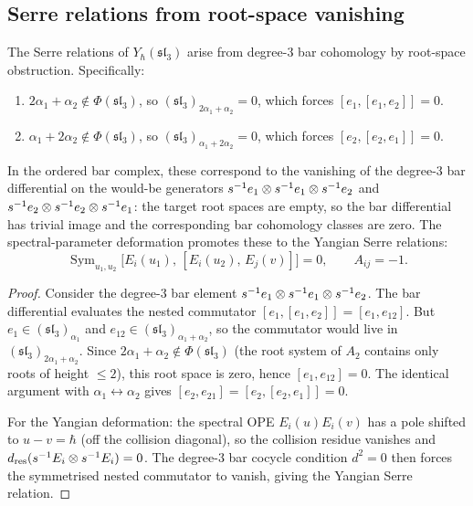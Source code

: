 \subsection{Serre relations from root-space vanishing}

\begin{proposition}
\label{prop:sl3-serre}
The Serre relations of $Y_\hbar(\mathfrak{sl}_3)$ arise from degree-$3$
bar cohomology by root-space obstruction. Specifically:
\begin{enumerate}[label=(\roman*)]
\item $2\alpha_1+\alpha_2\notin\Phi(\mathfrak{sl}_3)$, so
$(\mathfrak{sl}_3)_{2\alpha_1+\alpha_2}=0$, which forces
$[e_1,[e_1,e_2]]=0$.
\item $\alpha_1+2\alpha_2\notin\Phi(\mathfrak{sl}_3)$, so
$(\mathfrak{sl}_3)_{\alpha_1+2\alpha_2}=0$, which forces
$[e_2,[e_2,e_1]]=0$.
\end{enumerate}
In the ordered bar complex, these correspond to the vanishing of
the degree-$3$ bar differential on the would-be generators
$s^{-1}e_1\otimes s^{-1}e_1\otimes s^{-1}e_2$ and
$s^{-1}e_2\otimes s^{-1}e_2\otimes s^{-1}e_1$:
the target root spaces are empty, so the bar differential has
trivial image and the corresponding bar cohomology classes are zero.
The spectral-parameter deformation promotes these to the Yangian
Serre relations:
\[
\operatorname{Sym}_{u_1,u_2}
\big[E_i(u_1),\,[E_i(u_2),\,E_j(v)]\big]=0,
\qquad
A_{ij}=-1.
\]
\end{proposition}

\begin{proof}
Consider the degree-$3$ bar element
$s^{-1}e_1\otimes s^{-1}e_1\otimes s^{-1}e_2$.
The bar differential evaluates the nested commutator
$[e_1,[e_1,e_2]]=[e_1,e_{12}]$. But $e_1\in(\mathfrak{sl}_3)_{\alpha_1}$
and $e_{12}\in(\mathfrak{sl}_3)_{\alpha_1+\alpha_2}$, so the commutator
would live in $(\mathfrak{sl}_3)_{2\alpha_1+\alpha_2}$. Since
$2\alpha_1+\alpha_2\notin\Phi(\mathfrak{sl}_3)$ (the root system of
$A_2$ contains only roots of height $\le 2$), this root space is zero,
hence $[e_1,e_{12}]=0$. The identical argument with $\alpha_1\leftrightarrow\alpha_2$
gives $[e_2,e_{21}]=[e_2,[e_2,e_1]]=0$.

For the Yangian deformation: the spectral OPE
$E_i(u)E_i(v)$ has a pole shifted to $u-v=\hbar$ (off the collision
diagonal), so the collision residue vanishes and
$d_{\mathrm{res}}(s^{-1}E_i\otimes s^{-1}E_i)=0$. The degree-$3$
bar cocycle condition $d^2=0$ then forces the symmetrised nested
commutator to vanish, giving the Yangian Serre relation.
\end{proof}


